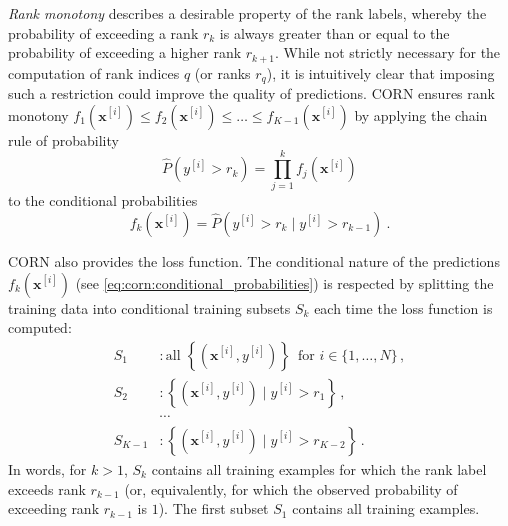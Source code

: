 \emph{Rank monotony} describes a desirable property of the rank labels,
whereby the probability of exceeding a rank $r_k$ is always greater than or equal to the probability of exceeding a higher rank $r_{k+1}$.
%
While not strictly necessary for the computation of rank indices $q$ (or ranks $r_q$),
it is intuitively clear that imposing such a restriction could improve the quality of predictions.
%
\Ac{CORN} ensures rank monotony
  $f_1(\mathbf{x}^{[i]}) \leq f_2(\mathbf{x}^{[i]}) \leq \ldots \leq f_{K-1}(\mathbf{x}^{[i]})$
by applying the chain rule of probability
\begin{equation}
  \hat{P}\left(y^{[i]} > r_k\right) = \prod_{j=1}^k f_j(\mathbf{x}^{[i]})
\end{equation}
to the conditional probabilities
\begin{equation}
  f_k(\mathbf{x}^{[i]}) = \hat{P}\left( y^{[i]} > r_k \mid y^{[i]} > r_{k-1} \right) \ .
  \label{eq:corn:conditional_probabilities}
\end{equation}
%

\Ac{CORN} also provides the loss function.
The conditional nature of the predictions $f_k(\mathbf{x}^{[i]})$
  (see \autoref{eq:corn:conditional_probabilities})
is respected
by splitting the training data into conditional training subsets $S_k$
  each time the loss function is computed:
\begin{align*}
  S_1 &: \text{all } \left\{\left( \mathbf{x}^{[i]}, y^{[i]} \right)\right\} \, \text{ for } i \in \{1, \ldots, N\} \, , \\
  S_2 &: \left\{\left( \mathbf{x}^{[i]}, y^{[i]} \right) \mid y^{[i]} > r_1 \right\} \, , \\
  &\cdots \\
  S_{K-1} &: \left\{\left( \mathbf{x}^{[i]}, y^{[i]} \right) \mid y^{[i]} > r_{K-2} \right\} \, .
\end{align*}
In words,
for $k > 1$,
  $S_k$ contains all training examples
  for which the rank label exceeds rank $r_{k-1}$
    (or, equivalently, for which the observed probability of exceeding rank $r_{k-1}$ is $1$).
The first subset $S_1$ contains all training examples.

